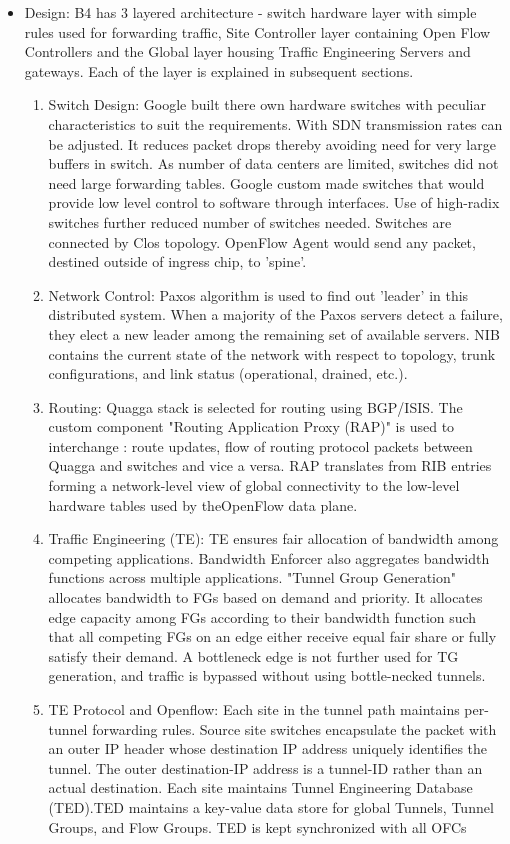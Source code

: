 \documentclass[letterpaper,twocolumn,10pt]{article}
\begin{document}
\begin{itemize}
\item Design:
B4 has 3 layered architecture - switch hardware layer with simple rules used for forwarding traffic, Site Controller layer containing Open Flow Controllers and the Global layer housing Traffic Engineering Servers and gateways. Each of the layer is explained in subsequent sections.
\begin{enumerate}
\item Switch Design: Google built there own hardware switches with peculiar characteristics to suit the requirements. With SDN transmission rates can be adjusted. It reduces packet drops thereby avoiding need for very large buffers in switch. As number of data centers are limited, switches did not need large forwarding tables. Google custom made switches that would provide low level control to software through interfaces. Use of high-radix switches further reduced number of switches needed.
	Switches are connected by Clos topology. OpenFlow Agent would send any packet, destined outside of ingress chip, to 'spine'.
\item Network Control: Paxos algorithm is used to find out 'leader' in this distributed system. When a majority of the Paxos servers detect a failure, they elect a new leader among the remaining set of available servers. NIB contains the current state of the network with respect to topology, trunk configurations, and link status (operational, drained, etc.).
\item Routing: Quagga stack is selected for routing using BGP/ISIS. The custom component "Routing Application Proxy (RAP)" is used to interchange : route updates, flow of routing protocol packets between Quagga and switches and vice a versa. RAP translates from RIB entries forming a network-level view of global connectivity to the low-level hardware tables used by theOpenFlow data plane.
\item Traffic Engineering (TE): TE ensures fair allocation of bandwidth among competing applications. Bandwidth Enforcer also aggregates bandwidth functions across multiple applications. "Tunnel Group Generation" allocates bandwidth to FGs based on demand and priority. It allocates edge capacity among FGs according to their bandwidth function such that all competing FGs on an edge either receive equal fair share or fully satisfy their demand. A bottleneck edge is not further used for TG generation, and traffic is bypassed without using bottle-necked tunnels.
\item TE Protocol and Openflow: Each site in the tunnel path maintains per-tunnel forwarding rules. Source site switches encapsulate the packet with an outer IP header whose destination IP address uniquely identifies the tunnel. The outer destination-IP address is a tunnel-ID rather than an actual destination. Each site maintains Tunnel Engineering Database (TED).TED maintains a key-value data store for global Tunnels, Tunnel Groups, and Flow Groups. TED is kept synchronized with all OFCs

\end{enumerate}
\end{itemize}
\end{document}
